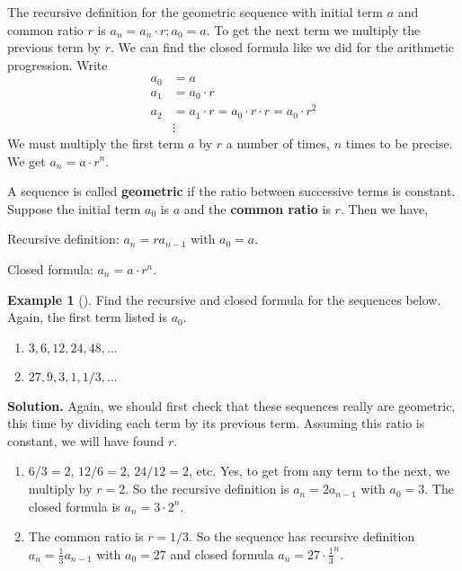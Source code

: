 \documentclass[10pt,]{book}
\newcommand{\terminology}[1]{\textbf{#1}}
\theoremstyle{plain}
\theoremstyle{definition}
\theoremstyle{definition}
\newtheorem{example}[theorem]{Example}
\theoremstyle{definition}
\theoremstyle{definition}
\numberwithin{equation}{chapter}
\newcommand{\amp}{&}
\begin{document}
\par
\hypertarget{p-118}{}%
The recursive definition for the geometric sequence with initial term \(a\) and common ratio \(r\) is \(a_n = a_{n}\cdot r; a_0 = a\). To get the next term we multiply the previous term by \(r\). We can find the closed formula like we did for the arithmetic progression. Write%
\begin{align*}
a_0 \amp = a\\
a_1 \amp = a_0\cdot r\\
a_2 \amp = a_1 \cdot r = a_0\cdot r\cdot r = a_0\cdot r^2\\
\amp \vdots 
\end{align*}
We must multiply the first term \(a\) by \(r\) a number of times, \(n\) times to be precise. We get \(a_n = a\cdot r^{n}\).%
\begin{assemblage}\label{assemblage-4}
\hypertarget{p-119}{}%
A sequence is called \terminology{geometric} if the ratio between successive terms is constant. Suppose the initial term \(a_0\) is \(a\) and the \terminology{common ratio} is \(r\). Then we have,%
\par
\hypertarget{p-120}{}%
Recursive definition: \(a_n = ra_{n-1}\) with \(a_0 = a\).%
\par
\hypertarget{p-121}{}%
Closed formula: \(a_n = a\cdot r^{n}\).%
\end{assemblage}
\begin{example}[]\label{example-6}
\hypertarget{p-122}{}%
Find the recursive and closed formula for the sequences below. Again, the first term listed is \(a_0\). \leavevmode%
\begin{enumerate}
\item\hypertarget{li-82}{}\(3, 6, 12, 24, 48, \ldots\)%
\item\hypertarget{li-83}{}\(27, 9, 3, 1, 1/3, \ldots\)%
\end{enumerate}
%
\par\smallskip%
\noindent\textbf{Solution.}\hypertarget{solution-8}{}\quad%
\hypertarget{p-123}{}%
Again, we should first check that these sequences really are geometric, this time by dividing each term by its previous term.  Assuming this ratio is constant, we will have found \(r\). \leavevmode%
\begin{enumerate}
\item\hypertarget{li-84}{}\(6/3 = 2\), \(12/6 = 2\), \(24/12 = 2\), etc. Yes, to get from any term to the next, we multiply by \(r = 2\). So the recursive definition is \(a_n = 2a_{n-1}\) with \(a_0 = 3\). The closed formula is \(a_n = 3\cdot 2^{n}\).%
\item\hypertarget{li-85}{}\hypertarget{p-124}{}%
The common ratio is \(r = 1/3\). So the sequence has recursive definition \(a_n = \frac{1}{3}a_{n-1}\) with \(a_0 = 27\) and closed formula \(a_n = 27\cdot \frac{1}{3}^{n}\).%
\end{enumerate}
%
\end{example}
\end{document}
